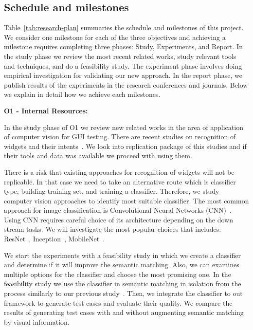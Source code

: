 \subsection{Schedule and milestones}



Table~\ref{tab:research-plan} summaries the schedule and milestones of this project.
We consider one milestone for each of the three objectives and achieving a  milestone requires completing  three phases: Study, Experiments, and Report. 
In the study phase we review the most recent related works, study relevant tools and techniques, and do a feasibility study. 
The experiment phase involves doing empirical investigation for validating our new approach. 
In the report phase, we publish results of the experiments in the research conferences and journals.
Below we explain in detail how we achieve each milestones. 

\bigskip
\noindent
\textbf{O1 - Internal Resources:}  

\bigskip
\noindent
In the study phase of O1 we review new related works in the area of application of computer vision for GUI testing. 
There are recent studies on recognition of widgets and their intents~\cite{zhu2021widgetrecog, white:WidgetDetection:ISSTA:2019}. 
We look into replication package of this studies and if their tools and data was available we proceed with using them.  

\bigskip
There is a risk that existing approaches for recognition of widgets will not be replicable. 
In that case we need to take an alternative route which is classifier type, building training set, and training a classifier.  
Therefore, we study computer vision approaches to identify most suitable classifier. 
The most common approach for image classification is Convolutional Neural Networks (CNN)~\cite{lecun1995convolutional}. 
Using CNN requires careful choice of its architecture depending on the down stream tasks. 
We will investigate the most popular choices that includes: ResNet~\cite{he:ResNet:CVPR:2016}, Inception~\cite{szegedy:inception:CVPR:2015}, MobileNet~\cite{howard:mobilenets:arxiv:2017}.

\bigskip
We start the experiments with a feasibility study in which we create a classifier and determine if it will improve the semantic matching. 
Also, we can examines multiple options for the classifier and choose the most promising one. 
In the feasibility study we use the classifier in semantic matching in isolation from the \testreuse process similarly to our previous study~\cite{mariani:SemFinder:ISSTA:2021}. 
Then, we integrate the classifier to out \tme framework to generate test cases and evaluate their quality. 
We compare the results of generating test cases with and without augmenting semantic matching by visual information.

